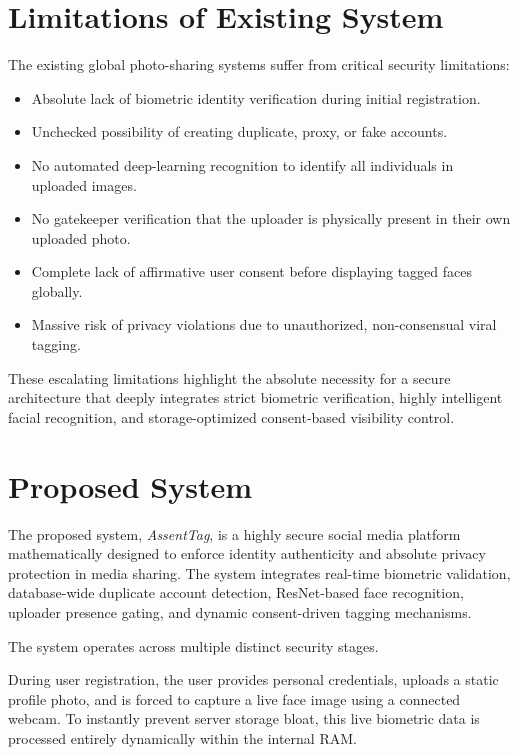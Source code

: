 \section{Limitations of Existing System}

The existing global photo-sharing systems suffer from critical security limitations:

\begin{itemize}
\item Absolute lack of biometric identity verification during initial registration.
\item Unchecked possibility of creating duplicate, proxy, or fake accounts.
\item No automated deep-learning recognition to identify all individuals in uploaded images.
\item No gatekeeper verification that the uploader is physically present in their own uploaded photo.
\item Complete lack of affirmative user consent before displaying tagged faces globally.
\item Massive risk of privacy violations due to unauthorized, non-consensual viral tagging.
\end{itemize}

These escalating limitations highlight the absolute necessity for a secure architecture that deeply integrates strict biometric verification, highly intelligent facial recognition, and storage-optimized consent-based visibility control.

\section{Proposed System}

The proposed system, \textit{AssentTag}, is a highly secure social media platform mathematically designed to enforce identity authenticity and absolute privacy protection in media sharing. The system integrates real-time biometric validation, database-wide duplicate account detection, ResNet-based face recognition, uploader presence gating, and dynamic consent-driven tagging mechanisms.

The system operates across multiple distinct security stages.

During user registration, the user provides personal credentials, uploads a static profile photo, and is forced to capture a live face image using a connected webcam. To instantly prevent server storage bloat, this live biometric data is processed entirely dynamically within the internal RAM.

